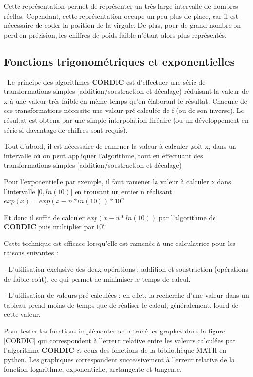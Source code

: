 \documentclass{article}
\begin{document}
Cette représentation permet de représenter un très large intervalle de nombres réelles. Cependant, cette représentation occupe un peu plus de place, car il est nécessaire de coder la position de la virgule. De plus, pour de grand nombre on perd en précision, les chiffres de poids faible n'étant alors plus représentés. 
  
\subsection{Fonctions trigonométriques et exponentielles}
\
\indent Le principe des algorithmes \textbf{CORDIC} est d'effectuer une série de transformations simples (addition/soustraction et décalage) réduisant la valeur de x à une valeur très faible en même temps qu'en élaborant le résultat. Chacune de ces transformations nécessite une valeur pré-calculée de f (ou de son inverse). Le résultat est obtenu par une simple interpolation linéaire (ou un développement en série si davantage de chiffres sont requis).

Tout d'abord, il est nécessaire de ramener la valeur à calculer ,soit x, dans un intervalle où on peut appliquer l'algorithme, tout en effectuant des transformations simples (addition/soustraction et décalage)

Pour l'exponentielle par exemple, il faut ramener la valeur à calculer x dans l'intervalle $ [0,ln(10)[ $ en trouvant un entier n réalisant : $ exp(x)= exp(x-n*ln(10))*10^n $

Et donc il suffit de calculer $exp(x-n*ln(10))$ par l'algorithme de \textbf{CORDIC} puis multiplier par $ 10^n $

Cette technique est efficace lorsqu’elle est ramenée à une calculatrice pour les raisons suivantes :
\par - L'utilisation exclusive des deux opérations : addition et soustraction (opérations de faible coût), ce qui permet de minimiser le temps de calcul.
\par - L'utilisation de valeurs pré-calculées : en effet, la recherche d'une valeur dans un tableau prend moins de temps que de réaliser le calcul, généralement, lourd de cette valeur.

Pour tester les fonctions implémenter on a tracé les graphes dans la figure \ref{CORDIC} qui correspondent à l'erreur relative entre les valeurs calculées par l'algorithme \textbf{CORDIC} et ceux des fonctions de la bibliothèque MATH en python. Les graphiques correspondent successivement à l'erreur relative de la fonction logarithme, exponentielle, arctangente et tangente.
\end{document}
